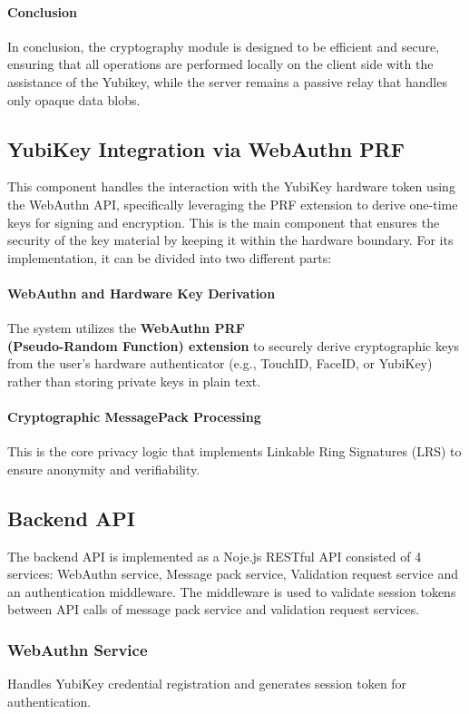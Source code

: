 \documentclass[letterpaper,11pt]{article}
\begin{document}
\paragraph{Conclusion} In conclusion, the cryptography module is designed to be efficient and secure, ensuring that all operations are performed locally on the client side with the assistance of the Yubikey, while the server remains a passive relay that handles only opaque data blobs.

\subsection{YubiKey Integration via WebAuthn PRF}

This component handles the interaction with the YubiKey hardware token using the WebAuthn API, specifically leveraging the PRF extension to derive one-time keys for signing and encryption. This is the main component that ensures the security of the key material by keeping it within the hardware boundary. For its implementation, it can be divided into two different parts:

\paragraph{WebAuthn and Hardware Key Derivation}
The system utilizes the \textbf{WebAuthn PRF \\ (Pseudo-Random Function) extension} to securely derive cryptographic keys from the user's hardware authenticator (e.g., TouchID, FaceID, or YubiKey) rather than storing private keys in plain text.

\paragraph{Cryptographic MessagePack Processing}
This is the core privacy logic that implements Linkable Ring Signatures (LRS) to ensure anonymity and verifiability.

\subsection{Backend API}
The backend API is implemented as a Noje.js RESTful API consisted of 4 services:
WebAuthn service, Message pack service, Validation request service and an authentication middleware. The middleware is used to validate session tokens between API calls of message pack service and validation request services.

\subsubsection*{WebAuthn Service}
Handles YubiKey credential registration and generates session token for authentication.
\end{document}
